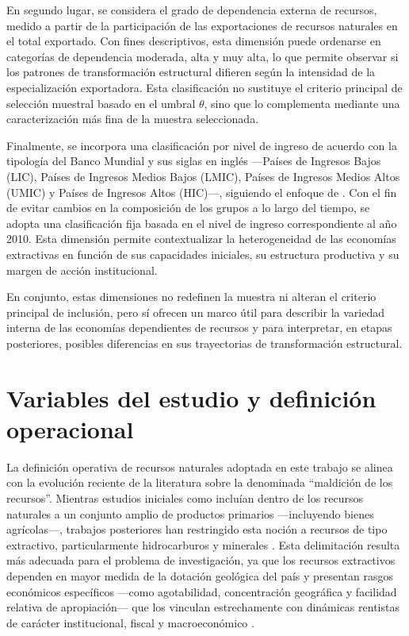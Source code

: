 \documentclass[../../TFM.tex]{subfiles}
\begin{document}
	En segundo lugar, se considera el grado de dependencia externa de
	recursos, medido a partir de la participación de las exportaciones de
	recursos naturales en el total exportado. Con fines descriptivos, esta
	dimensión puede ordenarse en categorías de dependencia moderada, alta y
	muy alta, lo que permite observar si los patrones de transformación
	estructural difieren según la intensidad de la especialización
	exportadora. Esta clasificación no sustituye el criterio principal de
	selección muestral basado en el umbral $\theta$, sino que lo complementa
	mediante una caracterización más fina de la muestra seleccionada.

	Finalmente, se incorpora una clasificación por nivel de ingreso de acuerdo
	con la tipología del Banco Mundial y sus siglas en inglés ---Países de Ingresos Bajos (LIC),
	Países de Ingresos Medios Bajos (LMIC), Países de Ingresos Medios Altos (UMIC)
	y Países de Ingresos Altos (HIC)---, siguiendo el enfoque de
	\textcite{Anne2021}. Con el fin de evitar cambios en la composición de los
	grupos a lo largo del tiempo, se adopta una clasificación fija basada en
	el nivel de ingreso correspondiente al año 2010. Esta dimensión permite
	contextualizar la heterogeneidad de las economías extractivas en función
	de sus capacidades iniciales, su estructura productiva y su margen de
	acción institucional.

	En conjunto, estas dimensiones no redefinen la muestra ni alteran el
	criterio principal de inclusión, pero sí ofrecen un marco útil para
	describir la variedad interna de las economías dependientes de recursos y
	para interpretar, en etapas posteriores, posibles diferencias en sus
	trayectorias de transformación estructural.
	\section{Variables del estudio y definición operacional}
	\label{sec:variables-estudio}

La definición operativa de recursos naturales adoptada en este trabajo se
alinea con la evolución reciente de la literatura sobre la denominada
``maldición de los recursos''. Mientras estudios iniciales como
\textcite{Sachs1995, Sachs1997} incluían dentro de los recursos naturales
a un conjunto amplio de productos primarios ---incluyendo bienes
agrícolas---, trabajos posteriores han restringido esta noción a
recursos de tipo extractivo, particularmente hidrocarburos y minerales
\parencite{Isham2005}. Esta delimitación resulta más adecuada para el
problema de investigación, ya que los recursos extractivos dependen en
mayor medida de la dotación geológica del país y presentan rasgos
económicos específicos ---como agotabilidad, concentración geográfica y
facilidad relativa de apropiación--- que los vinculan estrechamente con
dinámicas rentistas de carácter institucional, fiscal y macroeconómico
\parencite{Boschini2007, Lashitew2021}.
\end{document}
